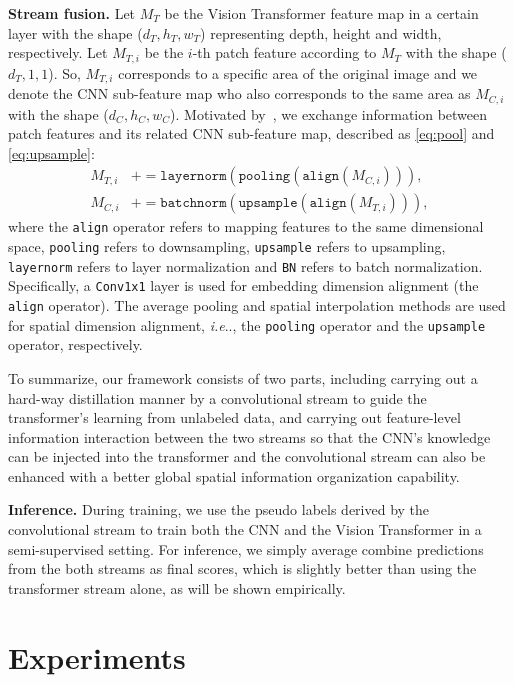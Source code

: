 \documentclass[runningheads]{llncs}
\makeatletter
\DeclareRobustCommand\onedot{\futurelet\@let@token\@onedot}
\def\@onedot{\ifx\@let@token.\else.\null\fi\xspace}
\def\ie{\emph{i.e}\onedot} \def\Ie{\emph{I.e}\onedot}
\newcommand{\fakeparagraph}[1]{\textbf{#1}}
\makeatother
\begin{document}
\fakeparagraph{Stream fusion.} Let $M_T$ be the Vision Transformer feature map in a certain layer with the shape ($d_T, h_T, w_T$) representing depth, height and width, respectively. Let $M_{T,i}$ be the $i$-th patch feature according to $M_T$ with the shape ($d_T, 1, 1$). So, $M_{T,i}$ corresponds to a specific area of the original image and we denote the CNN sub-feature map who also corresponds to the same area as $M_{C,i}$ with the shape ($d_C, h_C, w_C$). Motivated by~\cite{peng2021conformer}, we exchange information between patch features and its related CNN sub-feature map, described as \cref{eq:pool} and \cref{eq:upsample}:
\begin{align}
M_{T,i}&\mathrel{+}= {\texttt{layernorm}}({\texttt{pooling}}(\texttt{align}(M_{C,i}))),
\label{eq:pool}\\
M_{C,i}&\mathrel{+}= {\texttt{batchnorm}}({\texttt{upsample}}(\texttt{align}(M_{T,i}))),
\label{eq:upsample}
\end{align}
where the \texttt{align} operator refers to mapping features to the same dimensional space, \texttt{pooling} refers to downsampling, \texttt{upsample} refers to upsampling, \texttt{layernorm} refers to layer normalization and \texttt{BN} refers to batch normalization.
Specifically, a \texttt{Conv1x1} layer is used for embedding dimension alignment (the \texttt{align} operator). The average pooling and spatial interpolation methods are used for spatial dimension alignment, \ie, the \texttt{pooling} operator and the \texttt{upsample} operator, respectively.



To summarize, our framework consists of two parts, including carrying out a hard-way distillation manner by a convolutional stream to guide the transformer's learning from unlabeled data, and carrying out feature-level information interaction between the two streams so that the CNN's knowledge can be injected into the transformer and the convolutional stream can also be enhanced with a better global spatial information organization capability. 


\fakeparagraph{Inference.} During training, we use the pseudo labels derived by the convolutional stream to train both the CNN and the Vision Transformer in a semi-supervised setting. For inference, we simply average combine predictions from the both streams as final scores, which is slightly better than using the transformer stream alone, as will be shown empirically.
 


\section{Experiments}
\end{document}
